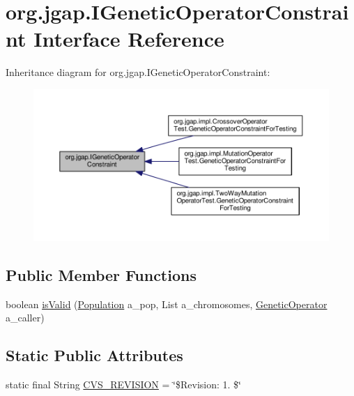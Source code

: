 \hypertarget{interfaceorg_1_1jgap_1_1_i_genetic_operator_constraint}{\section{org.\-jgap.\-I\-Genetic\-Operator\-Constraint Interface Reference}
\label{interfaceorg_1_1jgap_1_1_i_genetic_operator_constraint}
}


Inheritance diagram for org.\-jgap.\-I\-Genetic\-Operator\-Constraint\-:
\nopagebreak
\begin{figure}[H]
\begin{center}
\leavevmode
\includegraphics[width=350pt]{interfaceorg_1_1jgap_1_1_i_genetic_operator_constraint__inherit__graph}
\end{center}
\end{figure}
\subsection*{Public Member Functions}
\begin{DoxyCompactItemize}
\item 
boolean \hyperlink{interfaceorg_1_1jgap_1_1_i_genetic_operator_constraint_aad6e4b9c79f35e6e569e8d3c98876c50}{is\-Valid} (\hyperlink{classorg_1_1jgap_1_1_population}{Population} a\-\_\-pop, List a\-\_\-chromosomes, \hyperlink{interfaceorg_1_1jgap_1_1_genetic_operator}{Genetic\-Operator} a\-\_\-caller)
\end{DoxyCompactItemize}
\subsection*{Static Public Attributes}
\begin{DoxyCompactItemize}
\item 
static final String \hyperlink{interfaceorg_1_1jgap_1_1_i_genetic_operator_constraint_a416f31433b541f0c56740872334e0d3b}{C\-V\-S\-\_\-\-R\-E\-V\-I\-S\-I\-O\-N} = \char`\"{}\$Revision\-: 1. \$\char`\"{}
\end{DoxyCompactItemize}


